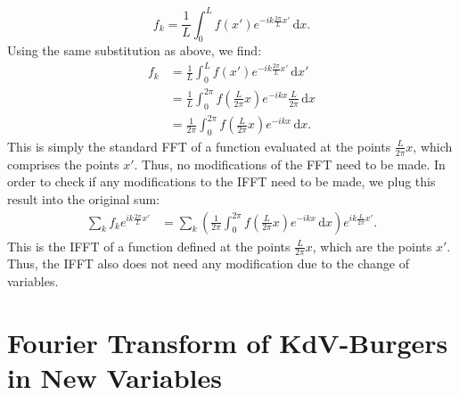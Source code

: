 \documentclass{article}
\begin{document}
\begin{equation}
f_k = \frac{1}{L}\int_0^L f(x')e^{-ik\frac{2\pi}{L}x'}\,\mathrm{d}x.
\end{equation}Using the same substitution as above, we find:
\begin{align*}
f_k &= \frac{1}{L}\int_0^L f(x')e^{-ik\frac{2\pi}{L}x'}\,\mathrm{d}x' \\
&= \frac{1}{L}\int_0^{2\pi} f\left(\frac{L}{2\pi}x\right)e^{-ikx}\frac{L}{2\pi}\,\mathrm{d}x \\
&= \frac{1}{2\pi}\int_0^{2\pi}f\left(\frac{L}{2\pi}x\right)e^{-ikx}\,\mathrm{d}x.
\end{align*}This is simply the standard FFT of a function evaluated at the points $\frac{L}{2\pi}x$, which comprises the points $x'$. Thus, no modifications of the FFT need to be made. In order to check if any modifications to the IFFT need to be made, we plug this result into the original sum:
\begin{align*}
\sum_k f_k e^{ik\frac{2\pi}{L}x'}&=\sum_k \left(\frac{1}{2\pi}\int_0^{2\pi} f\left(\frac{L}{2\pi}x\right)e^{-ikx}\,\mathrm{d}x\right)e^{ik\frac{L}{2\pi}x'}.
\end{align*}This is the IFFT of a function defined at the points $\frac{L}{2\pi}x$, which are the points $x'$. Thus, the IFFT also does not need any modification due to the change of variables.

\section{Fourier Transform of KdV-Burgers in New Variables}
\end{document}
